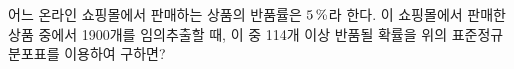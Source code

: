 \noindent\begin{minipage}[t]{0.58\linewidth}\vspace{0pt}\raggedright 어느 온라인 쇼핑몰에서 판매하는 상품의 반품률은 $5\mkern3mu \%$라 한다. 이 쇼핑몰에서 판매한 상품 중에서 1900개를 임의추출할 때, 이 중 114개 이상 반품될 확률을 위의 표준정규분포표를 이용하여 구하면?\end{minipage}\hfill\begin{minipage}[t]{0.4\linewidth}\vspace{0pt}\centering \resizebox{\ifdim\width>\linewidth\linewidth\else\width\fi}{!}{}\end{minipage}\par
{}
